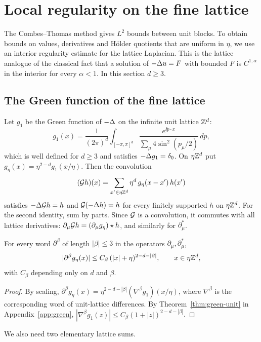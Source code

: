 \section{Local regularity on the fine lattice}\label{sec:regularity}

The Combes--Thomas method gives $L^2$ bounds between unit blocks. To obtain bounds on values, derivatives and H\"older quotients that are uniform in $\eta$, we use an interior regularity estimate for the lattice Laplacian. This is the lattice analogue of the classical fact that a solution of $-\Delta u=F$ with bounded $F$ is $C^{1,\alpha}$ in the interior for every $\alpha<1$. In this section $d\ge3$.

\subsection{The Green function of the fine lattice}

Let $g_1$ be the Green function of $-\Delta$ on the infinite unit lattice $\mathbb Z^d$:
\[
g_1(x)=\frac1{(2\pi)^d}\int_{[-\pi,\pi]^d}\frac{e^{\ii p\cdot x}}{\sum_\mu4\sin^2(p_\mu/2)}\,dp ,
\]
which is well defined for $d\ge3$ and satisfies $-\Delta g_1=\delta_0$. On $\eta\mathbb Z^d$ put $g_\eta(x)=\eta^{2-d}g_1(x/\eta)$. Then the convolution
\[
(\mathcal G h)(x)=\sum_{x'\in\eta\mathbb Z^d}\eta^d\,g_\eta(x-x')\,h(x')
\]
satisfies $-\Delta\mathcal G h=h$ and $\mathcal G(-\Delta h)=h$ for every finitely supported $h$ on $\eta\mathbb Z^d$. For the second identity, sum by parts. Since $\mathcal G$ is a convolution, it commutes with all lattice derivatives: $\partial_\mu\mathcal G h=(\partial_\mu g_\eta)\star h$, and similarly for $\partial^*_\mu$.

\begin{proposition}\label{prop:green-eta}
For every word $\partial^\beta$ of length $|\beta|\le3$ in the operators $\partial_\mu,\partial^*_\mu$,
\[
|\partial^\beta g_\eta(x)|\le C_\beta\,(|x|+\eta)^{2-d-|\beta|},\qquad x\in\eta\mathbb Z^d,
\]
with $C_\beta$ depending only on $d$ and $\beta$.
\end{proposition}

\begin{proof}
By scaling, $\partial^\beta g_\eta(x)=\eta^{2-d-|\beta|}(\nabla^\beta g_1)(x/\eta)$, where $\nabla^\beta$ is the corresponding word of unit-lattice differences. By Theorem~\ref{thm:green-unit} in Appendix~\ref{app:green}, $|\nabla^\beta g_1(z)|\le C_\beta(1+|z|)^{2-d-|\beta|}$.
\end{proof}

We also need two elementary lattice sums.

